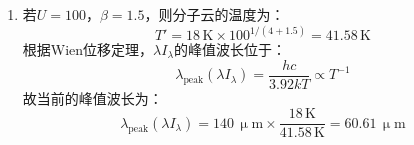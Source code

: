 \documentclass[a4paper,fontset=none]{ctexart}
\newcommand{\um}{\upmu\mathrm{m}}
\begin{document}
\begin{enumerate}
    \medskip
    \item[24.4 (b)]
    若$U = 100$，$\beta = 1.5$，则分子云的温度为：
    \[
        T' = 18\,\mathrm{K} \times 100^{1/(4+1.5)} = 41.58\,\mathrm{K}
    \]
    根据Wien位移定理，$\lambda I_\lambda$的峰值波长位于：
    \[
        \lambda_{\mathrm{peak}}(\lambda I_\lambda) = \frac{hc}{3.92kT} \propto T^{-1}
    \]
    故当前的峰值波长为：
    \[
        \lambda_{\mathrm{peak}}(\lambda I_\lambda) = 140\,\um \times \frac{18\,\mathrm{K}}{41.58\,\mathrm{K}} = 60.61\,\um
    \]

\end{enumerate}
\end{document}
